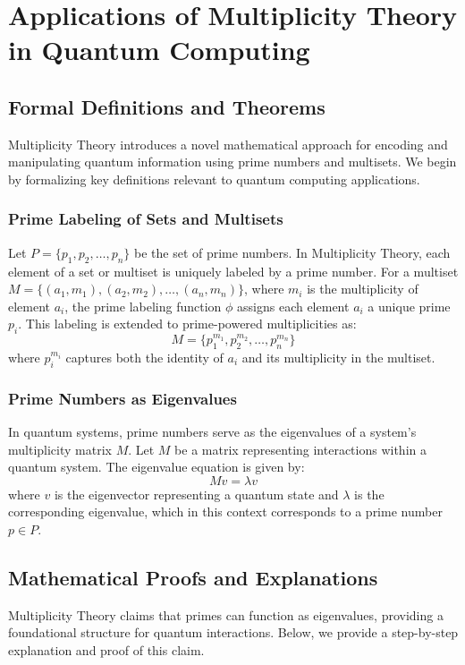\documentclass[%
 preprint, linenumbers,
 amsmath,amssymb,
 aps, physrev,
]{revtex4-2}
\begin{document}
\section{Applications of Multiplicity Theory in Quantum Computing}
\label{sec:QuantumComputing}

\subsection{Formal Definitions and Theorems}
Multiplicity Theory introduces a novel mathematical approach for encoding and manipulating quantum information using prime numbers and multisets. We begin by formalizing key definitions relevant to quantum computing applications.

\subsubsection{Prime Labeling of Sets and Multisets}
Let \( P = \{ p_1, p_2, \ldots, p_n \} \) be the set of prime numbers. In Multiplicity Theory, each element of a set or multiset is uniquely labeled by a prime number. For a multiset \( M = \{(a_1, m_1), (a_2, m_2), \dots, (a_n, m_n)\} \), where \( m_i \) is the multiplicity of element \( a_i \), the prime labeling function \( \phi \) assigns each element \( a_i \) a unique prime \( p_i \). This labeling is extended to prime-powered multiplicities as:
\[
M = \{p_1^{m_1}, p_2^{m_2}, \dots, p_n^{m_n}\}
\]
where \( p_i^{m_i} \) captures both the identity of \( a_i \) and its multiplicity in the multiset.

\subsubsection{Prime Numbers as Eigenvalues}
In quantum systems, prime numbers serve as the eigenvalues of a system's multiplicity matrix \( M \). Let \( M \) be a matrix representing interactions within a quantum system. The eigenvalue equation is given by:
\[
M v = \lambda v
\]
where \( v \) is the eigenvector representing a quantum state and \( \lambda \) is the corresponding eigenvalue, which in this context corresponds to a prime number \( p \in P \).

\subsection{Mathematical Proofs and Explanations}
Multiplicity Theory claims that primes can function as eigenvalues, providing a foundational structure for quantum interactions. Below, we provide a step-by-step explanation and proof of this claim.
\end{document}
